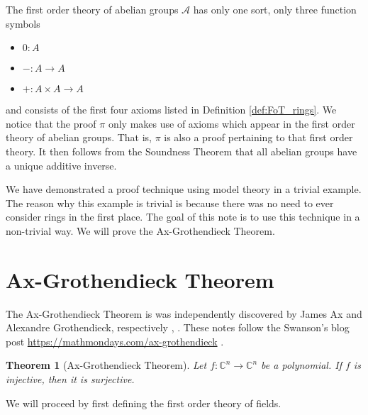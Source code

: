 \documentclass[12pt]{article}
\theoremstyle{plain}
\newtheorem{thm}{Theorem}[subsection] %
\theoremstyle{definition}
\newcommand{\bb}[1]{\mathbb{#1}}
\newcommand{\call}[1]{\mathcal{#1}}
\newcommand{\lto}{\longrightarrow}
\begin{document}
	The first order theory of abelian groups $\call{A}$ has only one sort, only three function symbols
	\begin{itemize}
		\item $0: A$
		\item $-: A \lto A$
		\item $+: A \times A \lto A$
		\end{itemize}
	and consists of the first four axioms listed in Definition \ref{def:FoT_rings}. We notice that the proof $\pi$ only makes use of axioms which appear in the first order theory of abelian groups. That is, $\pi$ is also a proof pertaining to that first order theory. It then follows from the Soundness Theorem \cite{FOL} that all abelian groups have a unique additive inverse.
	
	We have demonstrated a proof technique using model theory in a trivial example. The reason why this example is trivial is because there was no need to ever consider rings in the first place. The goal of this note is to use this technique in a non-trivial way. We will prove the Ax-Grothendieck Theorem.
	\section{Ax-Grothendieck Theorem}
	The Ax-Grothendieck Theorem is was independently discovered by James Ax and Alexandre Grothendieck, respectively \cite{Ax}, \cite{Groth}. These notes follow the Swanson's blog post \url{https://mathmondays.com/ax-grothendieck} \cite{MathMondays}.
	
	\begin{thm}[Ax-Grothendieck Theorem]\label{thm:ax_groth}
		Let $f: \bb{C}^n \lto \bb{C}^n$ be a polynomial. If $f$ is injective, then it is surjective.
		\end{thm}
	We will proceed by first defining the first order theory of fields.
	
\end{document}

